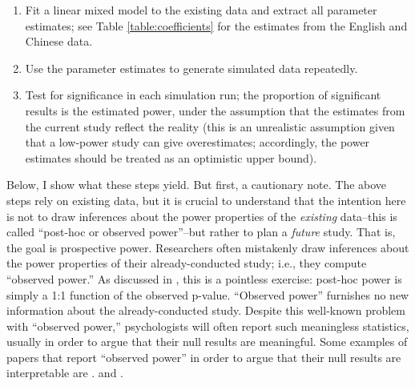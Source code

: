 \documentclass{ar-1col}\usepackage[]{graphicx}\usepackage[]{color}
\begin{document}
\begin{enumerate}
\item Fit a linear mixed model to the existing data and extract all parameter estimates; see Table \ref{table:coefficients} for the estimates from the English and Chinese data.
\item Use the parameter estimates  to generate simulated data repeatedly.
\item Test for significance in each simulation run; the proportion of significant results is the estimated power, under the assumption that the estimates from the current study reflect the reality (this is an unrealistic assumption given that a low-power study can give overestimates; accordingly, the power estimates should be treated as an optimistic upper bound).
\end{enumerate}

Below, I show what these steps yield. But first, a cautionary note.
The above steps rely on existing data, but it is crucial to understand that the intention here is not to draw inferences about the power properties of the \textit{existing} data--this is called ``post-hoc or observed power''--but rather to plan a \textit{future} study. That is, the goal is prospective power. Researchers often mistakenly draw inferences about the power properties of their already-conducted study; i.e., they compute ``observed power.'' As discussed in \citet{hoenigheisey}, this is a pointless exercise: post-hoc power is simply a 1:1 function of the observed p-value. ``Observed power'' furnishes no new information about the already-conducted study.
Despite this well-known problem with ``observed power,'' psychologists will often report such meaningless statistics, usually in order to argue that their null results are meaningful. Some examples of papers that report ``observed power'' in order to argue that their null results are interpretable are \citet{gordon04}. and \citet{berman2009search}.

 
\end{document}
